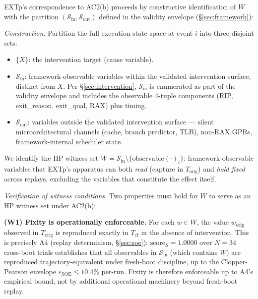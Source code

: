 \documentclass[conference]{IEEEtran}
\newcommand{\Korig}{T_\text{orig}}
\newcommand{\Tcf}{T_\text{cf}}
\newcommand{\scoreS}{\text{score}_S}
\newcommand{\epsSOE}{\varepsilon_\text{SOE}}
\begin{document}
EXTp's correspondence to AC2(b) proceeds by constructive
identification of $W$ with the partition
$(\mathcal{S}_\text{in}, \mathcal{S}_\text{out})$ defined in the
validity envelope (\S\ref{sec:framework}):

\emph{Construction.} Partition the full execution state space at
event $i$ into three disjoint sets:
\begin{itemize}[leftmargin=*]
  \item $\{X\}$: the intervention target (cause variable).
  \item $\mathcal{S}_\text{in}$: framework-observable variables
    within the validated intervention surface, distinct from $X$.
    Per \S\ref{sec:intervention}, $\mathcal{S}_\text{in}$ is
    enumerated as part of the validity envelope and includes the
    observable 4-tuple components (RIP, exit\_reason, exit\_qual,
    RAX) plus timing.
  \item $\mathcal{S}_\text{out}$: variables outside the validated
    intervention surface --- silent microarchitectural channels
    (cache, branch predictor, TLB), non-RAX GPRs,
    framework-internal scheduler state.
\end{itemize}

We identify the HP witness set $W = \mathcal{S}_\text{in}
\setminus \{\text{observable}(\cdot)_i\}$: framework-observable
variables that EXTp's apparatus can both \emph{read} (capture in
$\Korig$) and \emph{hold fixed} across replays, excluding the
variables that constitute the effect itself.

\emph{Verification of witness conditions.} Two properties must
hold for $W$ to serve as an HP witness set under AC2(b):

\textbf{(W1) Fixity is operationally enforceable.} For each
$w \in W$, the value $w_{\text{orig}}$ observed in $\Korig$ is
reproduced exactly in $\Tcf$ in the absence of intervention. This
is precisely A4 (replay determinism, \S\ref{sec:soe}):
$\scoreS = 1.0000$ over $N{=}34$ cross-boot trials establishes
that all observables in $\mathcal{S}_\text{in}$ (which contains
$W$) are reproduced trajectory-equivalent under fresh-boot
discipline, up to the Clopper-Pearson envelope
$\epsSOE \leq 10.4\%$ per-run. Fixity is therefore enforceable
up to A4's empirical bound, not by additional operational
machinery beyond fresh-boot replay.
\end{document}
